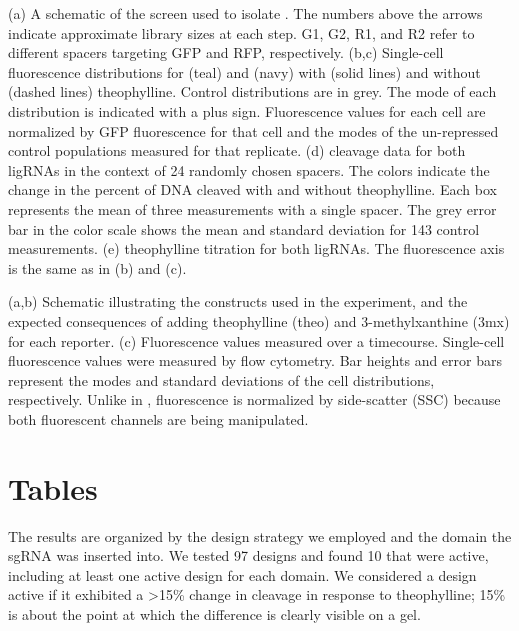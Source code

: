 \documentclass[10pt,oneside]{article}
\begin{document}
 (a) A schematic of the screen used to isolate \ligrnaF{}.  The numbers above 
 the arrows indicate approximate library sizes at each step.  G1, G2, R1, and 
 R2 refer to different spacers targeting GFP and RFP, respectively.
 (b,c) Single-cell fluorescence distributions for \ligrnaF{} (teal) and 
 \ligrnaB{} (navy) with (solid lines) and without (dashed lines) theophylline.  
 Control distributions are in grey.  The mode of each distribution is indicated 
 with a plus sign.  Fluorescence values for each cell are normalized by GFP 
 fluorescence for that cell and the modes of the un-repressed control 
 populations measured for that replicate.
 (d) \Invitro{} cleavage data for both ligRNAs in the context of 24 randomly 
 chosen spacers.  The colors indicate the change in the percent of DNA cleaved 
 with and without theophylline.  Each box represents the mean of three 
 measurements with a single spacer.   The grey error bar in the color scale 
 shows the mean and standard deviation for 143 control measurements.
 (e) \Invivo{} theophylline titration for both ligRNAs.  The fluorescence axis 
 is the same as in (b) and (c).
 



 (a,b) Schematic illustrating the constructs used in the experiment, and the 
 expected consequences of adding theophylline (theo) and 3-methylxanthine (3mx) 
 for each reporter.
 (c) Fluorescence values measured over a  timecourse.  Single-cell 
 fluorescence values were measured by flow cytometry.  Bar heights and error 
 bars represent the modes and standard deviations of the cell distributions, 
 respectively.  Unlike in , fluorescence is normalized by 
 side-scatter (SSC) because both fluorescent channels are being manipulated.

\section{Tables}



   The results are organized by 
 the design strategy we employed and the domain the sgRNA was inserted into.  
 We tested 97 designs and found 10 that were active, including at least one 
 active design for each domain.  We considered a design active if it exhibited 
 a >15\% change in cleavage in response to theophylline; 15\% is about the 
 point at which the difference is clearly visible on a gel.
\end{document}
